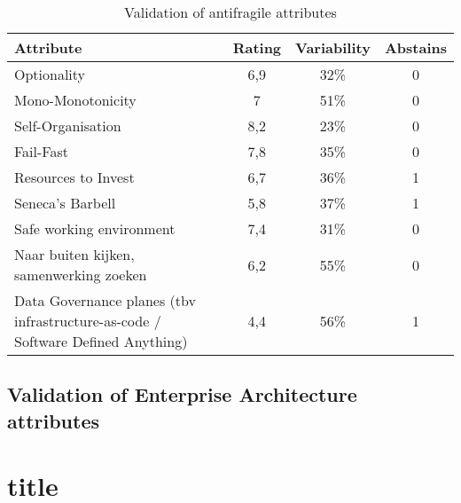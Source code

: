 \begin{table}[H]
	\centering
	\begin{tabular}{p{}ccc}
		\toprule
		\textbf{Attribute} & \textbf{Rating} & \textbf{Variability} & \textbf{Abstains} \\
		\midrule
		Optionality & 6,9 & 32\% & 0 \\%
		Mono-Monotonicity & 7 & 51\% & 0 \\%
		Self-Organisation & 8,2 & 23\% & 0 \\%
		Fail-Fast & 7,8 & 35\% & 0 \\%
		Resources to Invest & 6,7 & 36\% & 1 \\%
		Seneca's Barbell & 5,8 & 37\% & 1 \\%
		Safe working environment & 7,4 & 31\% & 0 \\%
		Naar buiten kijken, samenwerking zoeken & 6,2 & 55\% & 0 \\%
		Data Governance planes (tbv infrastructure-as-code / Software Defined Anything) & 4,4 & 56\% & 1 \\%
		\bottomrule
	\end{tabular}%
	\caption{Validation of antifragile attributes}
	\label{tab:validationofantifragileattributes}%
\end{table}%


\subsection{Validation of Enterprise Architecture attributes}
\label{sub:validationofenterprisearchitectureattributes}




\section{title}

